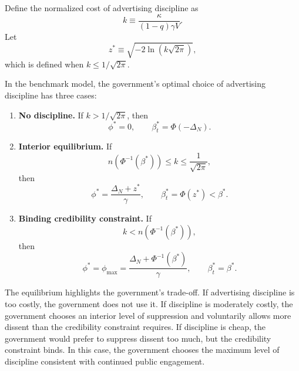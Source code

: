 Define the normalized cost of advertising discipline as
\begin{equation}
    k \equiv \frac{\kappa}{(1-q)\gamma V}.
\end{equation}
Let
\begin{equation}
    z^* \equiv \sqrt{-2\ln(k\sqrt{2\pi})},
\end{equation}
which is defined when $k\leq 1/\sqrt{2\pi}$.

\begin{proposition}
In the benchmark model, the government's optimal choice of advertising discipline has three cases:

\begin{enumerate}[label=(\roman*)]
    \item \textbf{No discipline.} If $k>1/\sqrt{2\pi}$, then
    \begin{equation}
        \phi^*=0, \qquad \beta_t^*=\Phi(-\Delta_N).
    \end{equation}

    \item \textbf{Interior equilibrium.} If
    \begin{equation}
        n\left(\Phi^{-1}(\beta^*)\right) \leq k \leq \frac{1}{\sqrt{2\pi}},
    \end{equation}
    then
    \begin{equation}
        \phi^*=\frac{\Delta_N+z^*}{\gamma}, \qquad \beta_t^*=\Phi(z^*)<\beta^*.
    \end{equation}

    \item \textbf{Binding credibility constraint.} If
    \begin{equation}
        k<n\left(\Phi^{-1}(\beta^*)\right),
    \end{equation}
    then
    \begin{equation}
        \phi^*=\phi_{\max}=\frac{\Delta_N+\Phi^{-1}(\beta^*)}{\gamma}, \qquad \beta_t^*=\beta^*.
    \end{equation}
\end{enumerate}
\end{proposition}

The equilibrium highlights the government's trade-off. If advertising discipline is too costly, the government does not use it. If discipline is moderately costly, the government chooses an interior level of suppression and voluntarily allows more dissent than the credibility constraint requires. If discipline is cheap, the government would prefer to suppress dissent too much, but the credibility constraint binds. In this case, the government chooses the maximum level of discipline consistent with continued public engagement.

